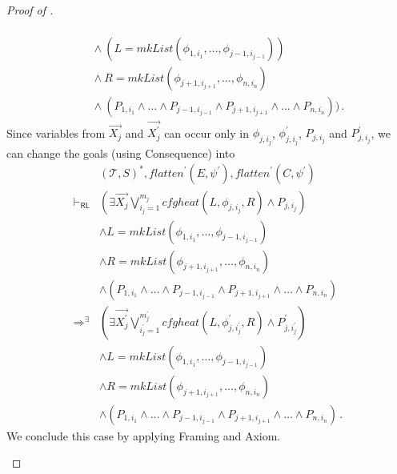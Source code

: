 \documentclass{article}
\newcommand{\RL}{\mathsf{RL}}
\begin{document}
\begin{proof}[Proof of ]
\begin{enumerate}
\begin{align*}
        \\&\quad \land (L = \mathit{mkList}(\phi_{1, i_1}, \ldots, \phi_{j-1, i_{j-1}}))
        \\&\quad \land R = \mathit{mkList}(\phi_{j+1, i_{j+1}}, \ldots, \phi_{n, i_{n}})
        \\&\quad \land (P_{1, i_1} \land \ldots \land P_{j-1, i_{j-1}} \land P_{j+1, i_{j+1}} \land \ldots \land P_{n, i_n})) \, .
    \end{align*}
    Since variables from $\vec{X_j}$ and $\vec{X_j^\prime}$ can occur only in $\phi_{j, i_j}$,
    $\phi^\prime_{j, i_j}$, $P_{j, i_j}$ and $P^\prime_{j, i_j}$, we can change the goals
    (using Consequence) into
    \begin{align*}
        & (\mathcal{T}, S)^*, \mathit{flatten}^\prime(E, \psi^\prime), \mathit{flatten}^\prime(C, \psi^\prime)
        \\ \vdash_\RL &
        (\exists \vec{X_j} \bigvee_{i_j=1}^{m_j} \mathit{cfgheat}(L, \phi_{j, i_j}, R) \land P_{j, i_j})
        \\&\land L = \mathit{mkList}(\phi_{1, i_1}, \ldots, \phi_{j-1, i_{j-1}})
        \\&\land R = \mathit{mkList}(\phi_{j+1, i_{j+1}}, \ldots, \phi_{n, i_{n}})
        \\&\land (P_{1, i_1} \land \ldots \land P_{j-1, i_{j-1}} \land P_{j+1, i_{j+1}} \land \ldots \land P_{n, i_n})
        \\ \Rightarrow^\exists &
        (\exists \vec{X^\prime_j} \bigvee_{i^\prime_j=1}^{m^\prime_j} \mathit{cfgheat}(L, \phi^\prime_{j, i^\prime_j}, R) \land P^\prime_{j, i^\prime_j})
        \\&\land L = \mathit{mkList}(\phi_{1, i_1}, \ldots, \phi_{j-1, i_{j-1}})
        \\&\land R = \mathit{mkList}(\phi_{j+1, i_{j+1}}, \ldots, \phi_{n, i_{n}})
        \\&\land (P_{1, i_1} \land \ldots \land P_{j-1, i_{j-1}} \land P_{j+1, i_{j+1}} \land \ldots \land P_{n, i_n}) \, .
    \end{align*}
    We conclude this case by applying Framing and Axiom.
    

\end{enumerate}
\end{proof}
\end{document}
